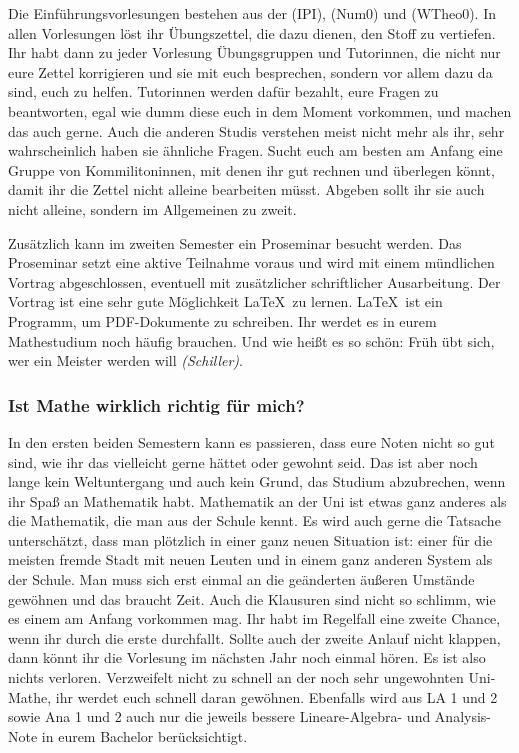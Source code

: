 Die Einführungsvorlesungen bestehen aus der  (\gls{IPI}),  (\gls{Num0}) und  (\gls{WTheo0}). In allen Vorlesungen löst ihr Übungszettel, die dazu dienen, den Stoff zu vertiefen. Ihr habt dann zu jeder Vorlesung Übungsgruppen und Tutorinnen, die nicht nur eure Zettel korrigieren und sie mit euch besprechen, sondern vor allem dazu da sind, euch zu helfen. Tutorinnen werden dafür bezahlt, eure Fragen zu beantworten, egal wie dumm diese euch in dem Moment vorkommen, und machen das auch gerne. Auch die anderen Studis verstehen meist nicht mehr als ihr, sehr wahrscheinlich haben sie ähnliche Fragen. Sucht euch am besten am Anfang eine Gruppe von Kommilitoninnen, mit denen ihr gut rechnen und überlegen könnt, damit ihr die Zettel nicht alleine bearbeiten müsst. Abgeben sollt ihr sie auch nicht alleine, sondern im Allgemeinen zu zweit.

Zusätzlich kann im zweiten Semester ein Proseminar besucht werden. Das Proseminar setzt eine aktive Teilnahme voraus und wird mit einem mündlichen Vortrag abgeschlossen, eventuell mit zusätzlicher schriftlicher Ausarbeitung. Der Vortrag ist eine sehr gute Möglichkeit \LaTeX\ zu lernen. \LaTeX\ ist ein Programm, um PDF-Dokumente zu schreiben. Ihr werdet es in eurem Mathestudium noch häufig brauchen. Und wie heißt es so schön: Früh übt sich, wer ein Meister werden will \textit{(Schiller)}.

\subsubsection{Ist Mathe wirklich richtig für mich?}

In den ersten beiden Semestern kann es passieren, dass eure Noten nicht so gut sind, wie ihr das vielleicht gerne hättet oder gewohnt seid. Das ist aber noch lange kein Weltuntergang und auch kein Grund, das Studium abzubrechen, wenn ihr Spaß an Mathematik habt. Mathematik an der Uni ist etwas ganz anderes als die Mathematik, die man aus der Schule kennt. Es wird auch gerne die Tatsache unterschätzt, dass man plötzlich in einer ganz neuen Situation ist: einer für die meisten fremde Stadt mit neuen Leuten und in einem ganz anderen System als der Schule. Man muss sich erst einmal an die geänderten äußeren Umstände gewöhnen und das braucht Zeit. Auch die Klausuren sind nicht so schlimm, wie es einem am Anfang vorkommen mag. Ihr habt im Regelfall eine zweite Chance, wenn ihr durch die erste durchfallt. Sollte auch der zweite Anlauf nicht klappen, dann könnt ihr die Vorlesung im nächsten Jahr noch einmal hören. Es ist also nichts verloren. Verzweifelt nicht zu schnell an der noch sehr ungewohnten Uni-Mathe, ihr werdet euch schnell daran gewöhnen. Ebenfalls wird aus \gls{LA} 1 und 2 sowie \gls{Ana} 1 und 2 auch nur die jeweils bessere Lineare-Algebra- und Analysis-Note in eurem Bachelor berücksichtigt.

